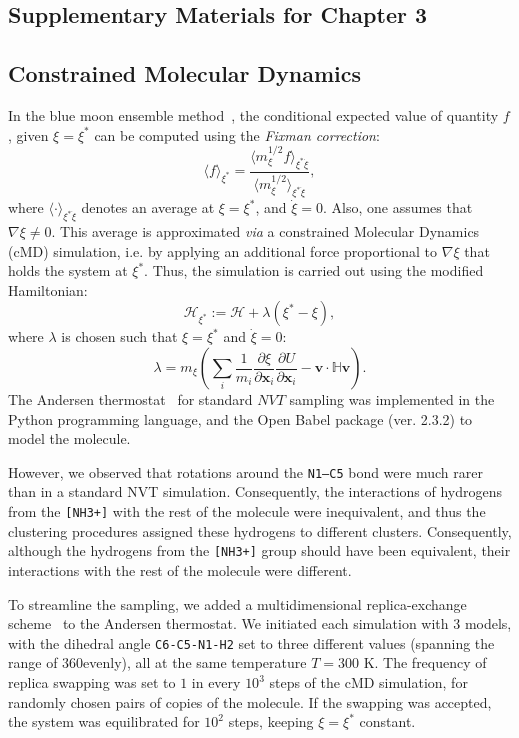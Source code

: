 \documentclass[a4paper,11pt,twoside]{book}%
\begin{document}
\begin{appendices}
\chapter{Supplementary Materials for Chapter 3}
\section{Constrained Molecular Dynamics}\label{sec:appendixA}

In the blue moon ensemble method~\cite{carter1989constrained}, the conditional expected value of quantity $f$, given $\xi=\xi^*$ can be computed using the \emph{Fixman correction}:
\begin{equation}\label{eq:fixman}
 \langle f \rangle_{\xi^*} = \frac{\langle m_\xi^{1/2} f \rangle_{\xi^*\dot{\xi}}}{\langle m_\xi^{1/2} \rangle_{\xi^*\dot{\xi}}},
\end{equation}
where $\langle \cdot \rangle_{\xi^*\dot{\xi}}$ denotes an average at $\xi=\xi^*$, and $\dot{\xi}=0$. 
Also, one assumes that \mbox{$\nabla\xi\neq0$}.
This average is approximated \emph{via} a constrained Molecular Dynamics (cMD) simulation, i.e. by applying an additional force proportional to $\nabla\xi$ that holds the system at $\xi^*$.
Thus, the simulation is carried out using the modified Hamiltonian:
$$
\mathcal{H}_{\xi^*} := \mathcal{H} + \lambda (\xi^* - \xi),
$$
where $\lambda$ is chosen such that $\xi=\xi^*$ and $\dot{\xi}=0$:
$$
\lambda = m_\xi \left( \sum_i \frac{1}{m_i}\frac{\partial\xi}{\partial\mathbf{x}_i}\frac{\partial U}{\partial\mathbf{x}_i} - \mathbf{v}\cdot\mathbb{H}\mathbf{v} \right).
$$
The Andersen thermostat~\cite{den2013revisiting} for standard $NVT$ sampling was implemented in the Python programming language, and the Open Babel package (ver. 2.3.2) to model the molecule.

However, we observed that rotations around the \texttt{N1--C5} bond were much rarer than in a standard NVT simulation.
Consequently, the interactions of hydrogens from the \texttt{[NH3+]} with the rest of the molecule were inequivalent, and thus the clustering procedures assigned these hydrogens to different clusters.
Consequently, although the hydrogens from the \texttt{[NH3+]} group should have been equivalent, their interactions with the rest of the molecule were different.

To streamline the sampling, we added a multidimensional replica-exchange scheme~\cite{sugita2000multidimensional} to the Andersen thermostat.
We initiated each simulation with 3 models, with the dihedral angle \texttt{C6-C5-N1-H2} set to three different values (spanning the range of 360\degree evenly), all at the same temperature $T=300$ K.
The frequency of replica swapping was set to $1$ in every $10^3$ steps of the cMD simulation, for randomly chosen pairs of copies of the molecule.
If the swapping was accepted, the system was equilibrated for $10^2$ steps, keeping $\xi=\xi^*$ constant.


\end{appendices}
\end{document}
